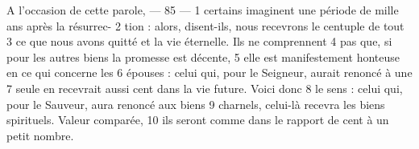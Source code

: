 A l'occasion de cette parole,	 
 	--- 85 ---	 
1	 	certains imaginent une période de mille ans après la résurrec-	 
2	 	tion : alors, disent-ils, nous recevrons le centuple de tout	 
3	 	ce que nous avons quitté et la vie éternelle. Ils ne comprennent	 
4	 	pas que, si pour les autres biens la promesse est décente,	 
5	 	elle est manifestement honteuse en ce qui concerne les	 
6	 	épouses : celui qui, pour le Seigneur, aurait renoncé à une	 
7	 	seule en recevrait aussi cent dans la vie future. Voici donc	 
8	 	le sens : celui qui, pour le Sauveur, aura renoncé aux biens	 
9	 	charnels, celui-là recevra les biens spirituels. Valeur comparée,	 
10	 	ils seront comme dans le rapport de cent à un petit nombre.